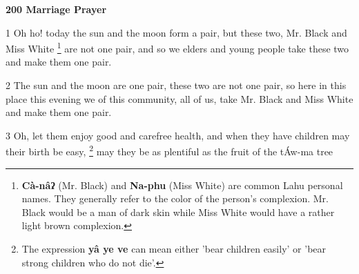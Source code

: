 
\textbf{200 Marriage Prayer}

1 Oh ho! today the sun and the moon form a pair, but these two, Mr. Black and Miss
White \footnote{\textbf{Cà-nâʔ} (Mr. Black) and \textbf{Na-phu }(Miss White) are common Lahu personal names. They generally refer to the color of the person's complexion. Mr. Black would be a man of dark skin while Miss White would have a rather light brown complexion.} are not one pair, and so we elders and young people take these two and
make them one pair.

2 The sun and the moon are one pair, these two are not one pair, so here in this
place this evening we of this community, all of us, take Mr. Black and Miss White
and make them one pair.

3 Oh, let them enjoy good and carefree health, and when they have children may
their birth be easy, \footnote{The expression \textbf{yâ ye ve} can mean either 'bear children easily' or 'bear strong children who do not die'.} may they be as plentiful as the fruit of the tÁw-ma tree

